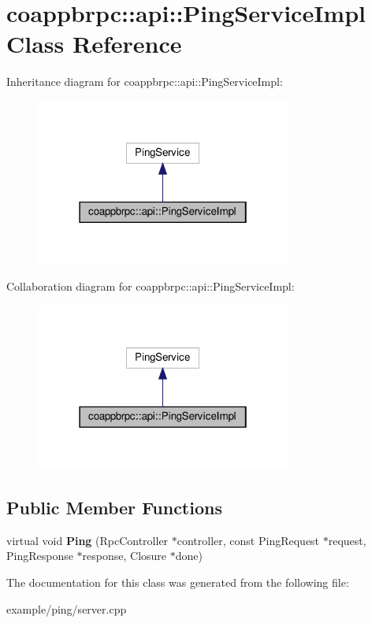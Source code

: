 \hypertarget{classcoappbrpc_1_1api_1_1PingServiceImpl}{}\section{coappbrpc\+:\+:api\+:\+:Ping\+Service\+Impl Class Reference}
\label{classcoappbrpc_1_1api_1_1PingServiceImpl}


Inheritance diagram for coappbrpc\+:\+:api\+:\+:Ping\+Service\+Impl\+:
\nopagebreak
\begin{figure}[H]
\begin{center}
\leavevmode
\includegraphics[width=238pt]{classcoappbrpc_1_1api_1_1PingServiceImpl__inherit__graph}
\end{center}
\end{figure}


Collaboration diagram for coappbrpc\+:\+:api\+:\+:Ping\+Service\+Impl\+:
\nopagebreak
\begin{figure}[H]
\begin{center}
\leavevmode
\includegraphics[width=238pt]{classcoappbrpc_1_1api_1_1PingServiceImpl__coll__graph}
\end{center}
\end{figure}
\subsection*{Public Member Functions}
\begin{DoxyCompactItemize}
\item 
\mbox{\label{classcoappbrpc_1_1api_1_1PingServiceImpl_ad0fdead8e69607ba9114b277fe96844b}} 
virtual void {\bfseries Ping} (Rpc\+Controller $\ast$controller, const Ping\+Request $\ast$request, Ping\+Response $\ast$response, Closure $\ast$done)
\end{DoxyCompactItemize}


The documentation for this class was generated from the following file\+:\begin{DoxyCompactItemize}
\item 
example/ping/server.\+cpp\end{DoxyCompactItemize}
